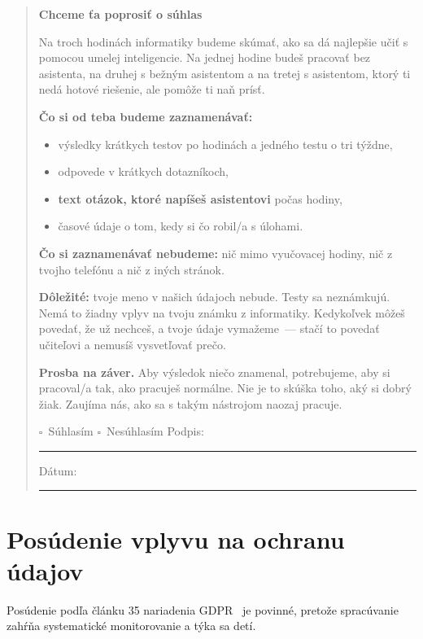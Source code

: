 \begin{quote}\small
\textbf{Chceme ťa poprosiť o súhlas}

Na troch hodinách informatiky budeme skúmať, ako sa dá najlepšie učiť s pomocou umelej inteligencie. Na jednej hodine budeš pracovať bez asistenta, na druhej s bežným asistentom a na tretej s asistentom, ktorý ti nedá hotové riešenie, ale pomôže ti naň prísť.

\textbf{Čo si od teba budeme zaznamenávať:}
\begin{itemize}[nosep]
    \item výsledky krátkych testov po hodinách a jedného testu o tri týždne,
    \item odpovede v krátkych dotazníkoch,
    \item \textbf{text otázok, ktoré napíšeš asistentovi} počas hodiny,
    \item časové údaje o tom, kedy si čo robil/a s úlohami.
\end{itemize}

\textbf{Čo si zaznamenávať nebudeme:} nič mimo vyučovacej hodiny, nič z tvojho telefónu a nič z iných stránok.

\textbf{Dôležité:} tvoje meno v našich údajoch nebude. Testy sa neznámkujú. Nemá to žiadny vplyv na tvoju známku z informatiky. Kedykoľvek môžeš povedať, že už nechceš, a tvoje údaje vymažeme~--- stačí to povedať učiteľovi a nemusíš vysvetľovať prečo.

\textbf{Prosba na záver.} Aby výsledok niečo znamenal, potrebujeme, aby si pracoval/a tak, ako pracuješ normálne. Nie je to skúška toho, aký si dobrý žiak. Zaujíma nás, ako sa s takým nástrojom naozaj pracuje.

\vspace{4pt}
$\square$~Súhlasím \qquad $\square$~Nesúhlasím \qquad Podpis: \rule{3.5cm}{0.4pt} \qquad Dátum: \rule{2.5cm}{0.4pt}
\end{quote}

\section{Posúdenie vplyvu na ochranu údajov}

Posúdenie podľa článku 35 nariadenia GDPR~\cite{gdpr2016} je povinné, pretože spracúvanie zahŕňa systematické monitorovanie a týka sa detí.

